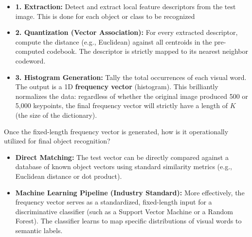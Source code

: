 {
\begin{itemize}
    \item \textbf{1. Extraction:} Detect and extract local feature descriptors from the test image. This is done for each object or class to be recognized
    \item \textbf{2. Quantization (Vector Association):} For every extracted descriptor, compute the distance (e.g., Euclidean) against all centroids in the pre-computed codebook. The descriptor is strictly mapped to its nearest neighbor codeword.
    \item \textbf{3. Histogram Generation:} Tally the total occurrences of each visual word. The output is a 1D \textbf{frequency vector} (histogram). This brilliantly normalizes the data: regardless of whether the original image produced 500 or 5,000 keypoints, the final frequency vector will strictly have a length of $K$ (the size of the dictionary).
\end{itemize}}

{Once the fixed-length frequency vector is generated, how is it operationally utilized for final object recognition?
\begin{itemize}
    \item \textbf{Direct Matching:} The test vector can be directly compared against a database of known object vectors using standard similarity metrics (e.g., Euclidean distance or dot product).
    \item \textbf{Machine Learning Pipeline (Industry Standard):} More effectively, the frequency vector serves as a standardized, fixed-length input for a discriminative classifier (such as a Support Vector Machine or a Random Forest). The classifier learns to map specific distributions of visual words to semantic labels.
\end{itemize}}
